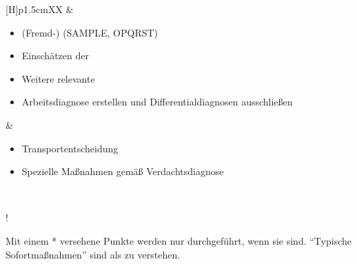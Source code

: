 \documentclass[
ngerman,
paper=a4,
asymmetric,
fontsize=9pt,
draft=false,
openany,
numbers=noenddot,
bibtotocnumbered,
footnotes=multiple,
toc=flat,
]{scrbook}
\begin{document}
{\begin{minipage}[t]{\linewidth -
{2\fboxrule} - {2\fboxsep}}
\begin{minipage}[t]{\linewidth}
{\begin{tabularx}{\linewidth}[H]{p{1.5cm}XX}
&
\begin{minipage}[t]{\linewidth}
\begin{itemize}
  \item (Fremd-)  (SAMPLE, OPQRST)
  \item Einschätzen der 
  \item Weitere relevante 
  \item Arbeitsdiagnose erstellen und Differentialdiagnosen
  ausschließen
\end{itemize}
\end{minipage}
&
\noindent\color{Indigo}\begin{minipage}[t]{\linewidth}
\begin{itemize}
  \item Transportentscheidung 
  \item Spezielle Maßnahmen gemäß Verdachtsdiagnose
\end{itemize}
\end{minipage}
\\\addlinespace\bottomrule
\end{tabularx}

\begin{center}
  !

{\tiny Mit einem * versehene Punkte werden nur durchgeführt,
wenn sie  sind. \enquote{Typische
Sofortmaßnahmen} sind als  zu verstehen.}
\end{center}
}
\end{minipage}
\end{minipage}\vspace{-\baselineskip}
}
\end{document}
